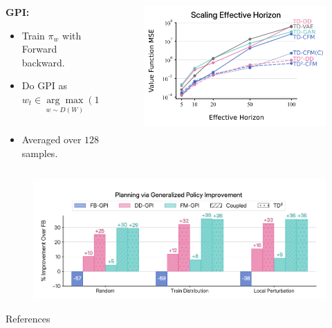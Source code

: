 \documentclass{beamer}
\begin{document}
\begin{frame}
    \begin{columns}
    \begin{column}{0.6\linewidth}
        \textbf{GPI:}
        \begin{itemize}
        \footnotesize
        \item Train \( \pi_w \) with Forward backward.
        \item Do GPI as $w_t \in \underset{w \sim D(W)}{\arg \max} \underbrace{(1 - \gamma)^{-1} \mathbb{E}_{X \sim m^{\pi_w}(\cdot | s_t, \pi_w(s_t)))}[r(X)]}_{Q^{\pi_w}(s_t, \pi_w(s_t))}.$
        \item Averaged over \( 128 \) samples.
        \end{itemize}
    \end{column}
    \begin{column}{0.4\linewidth}
    \begin{figure}
        \includegraphics[width=\linewidth]{figures/horizon-td-flow.png}
    \end{figure}
    \end{column}
    \end{columns}
    \begin{figure}
        \includegraphics[width=\linewidth]{figures/fm-gpi.png}
    \end{figure}
\end{frame}


\begin{frame}{References}
    \tiny
    
    
\end{frame}
\end{document}
